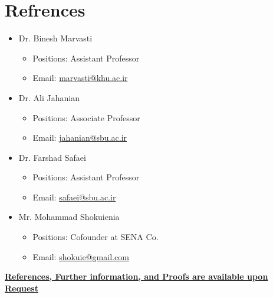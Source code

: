 \documentclass[10pt,a4paper,sans]{moderncv} %
\begin{document}
	\section{Refrences}
	\begin{itemize}
    	\item Dr. Binesh Marvasti
    	\begin{itemize}
    		\item Positions: Assistant Professor
    		\item Email: \href{mailto:marvasti@khu.ac.ir}{marvasti@khu.ac.ir}
    	\end{itemize}
    	\item Dr. Ali Jahanian
    	\begin{itemize}
    		\item Positions: Associate Professor
    		\item Email: \href{mailto:jahanian@sbu.ac.ir}{jahanian@sbu.ac.ir}
    	\end{itemize}
    	\item Dr. Farshad Safaei
    	\begin{itemize}
    		\item Positions: Assistant Professor
    		\item Email: \href{mailto:safaei@sbu.ac.ir}{safaei@sbu.ac.ir}
    	\end{itemize}    	
    	\item Mr. Mohammad Shokuienia
    	\begin{itemize}
    		\item Positions: Cofounder at SENA Co.
    		\item Email: \href{mailto:shokuie@gmail.com}{shokuie@gmail.com}
    	\end{itemize}    	

	\end{itemize}
	
	


	
	\vspace{0.3em}
	\centerline{\underline{\textbf{	\faExclamationCircle \hspace{0.5 pt} References, Further information, and Proofs are available upon Request}}}
	
\end{document}
